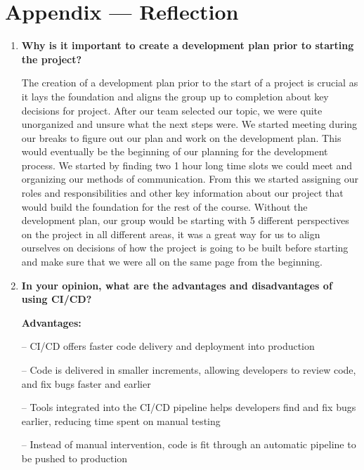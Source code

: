 \documentclass{article}
\begin{document}
\newpage{}

\section*{Appendix --- Reflection}




\begin{enumerate}
    \item \textbf{Why is it important to create a development plan prior to starting the project?}

    The creation of a development plan prior to the start of a project is crucial as it lays the foundation and aligns the group up to completion about key decisions for project. After our team selected our topic, we were quite unorganized and unsure what the next steps were. We started meeting during our breaks to figure out our plan and work on the development plan. This would eventually be the beginning of our planning for the development process. We started by finding two 1 hour long time slots we could meet and organizing our methods of communication. From this we started assigning our roles and responsibilities and other key information about our project that would build the foundation for the rest of the course. Without the development plan, our group would be starting with 5 different perspectives on the project in all different areas, it was a great way for us to align ourselves on decisions of how the project is going to be built before starting and make sure that we were all on the same page from the beginning.

    \item \textbf{In your opinion, what are the advantages and disadvantages of using CI/CD?}

    \textbf{Advantages:}

        -- CI/CD offers faster code delivery and deployment into production
      
        -- Code is delivered in smaller increments, allowing developers to review code, and fix bugs faster and earlier
      
        -- Tools integrated into the CI/CD pipeline helps developers find and fix bugs earlier, reducing time spent on manual testing
      
        -- Instead of manual intervention, code is fit through an automatic pipeline to be pushed to production
      

\end{enumerate}
\end{document}
